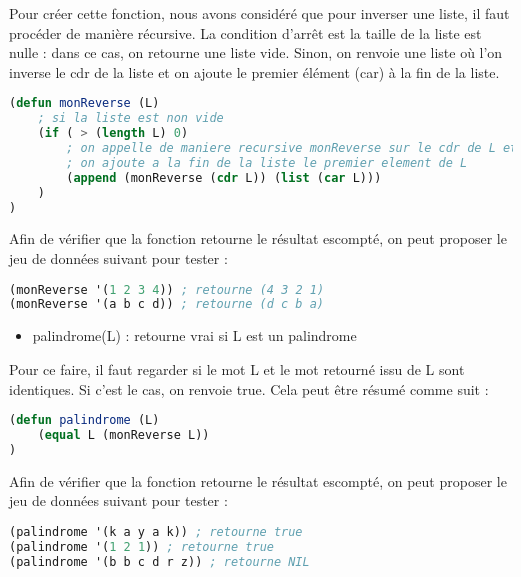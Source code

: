 \documentclass[a4paper, 12pt]{article}
\begin{document}
Pour créer cette fonction, nous avons considéré que pour inverser une liste, il faut procéder de manière récursive. La condition d’arrêt est la taille de la liste est nulle : dans ce cas, on retourne une liste vide. Sinon, on renvoie une liste où l’on inverse le cdr de la liste et on ajoute le premier élément (car) à la fin de la liste.
\vspace{2mm}

\begin{lstlisting}[language=Lisp]
(defun monReverse (L)
    ; si la liste est non vide
    (if ( > (length L) 0)
        ; on appelle de maniere recursive monReverse sur le cdr de L et
        ; on ajoute a la fin de la liste le premier element de L
        (append (monReverse (cdr L)) (list (car L)))
    )
)
\end{lstlisting}
\vspace{2mm}

Afin de vérifier que la fonction retourne le résultat escompté, on peut proposer le jeu de données suivant pour tester :
\vspace{2mm}

\begin{lstlisting}[language=Lisp]
(monReverse '(1 2 3 4)) ; retourne (4 3 2 1)
(monReverse '(a b c d)) ; retourne (d c b a)
\end{lstlisting}
\vspace{5mm}

\begin{itemize}[label=\textbullet]
\item palindrome(L) : retourne vrai si L est un palindrome
\end{itemize}
\vspace{3mm}

Pour ce faire, il faut regarder si le mot L et le mot retourné issu de L sont identiques. Si c’est le cas, on renvoie true. Cela peut être résumé comme suit :
\vspace{2mm}

\begin{lstlisting}[language=Lisp]
(defun palindrome (L)
    (equal L (monReverse L))
)
\end{lstlisting}
\vspace{2mm}

Afin de vérifier que la fonction retourne le résultat escompté, on peut proposer le jeu de données suivant pour tester :
\vspace{2mm}

\begin{lstlisting}[language=Lisp]
(palindrome '(k a y a k)) ; retourne true
(palindrome '(1 2 1)) ; retourne true
(palindrome '(b b c d r z)) ; retourne NIL
\end{lstlisting}
\end{document}
